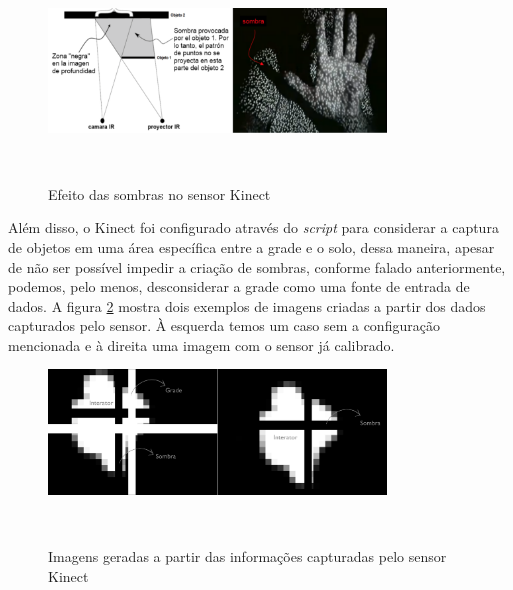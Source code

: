 \begin{figure}[H]
  \begin{center}
    \caption{Efeito das sombras no sensor Kinect}
    \vspace*{0,2cm}
    \includegraphics[width=0.8\textwidth]{./04-figuras/kinect_sombras}
    \label{fig:kinect_sombras}
  \end{center}
  \vspace*{-0,5cm}
  \\
\end{figure}

Além disso, o Kinect foi configurado através do \textit{script} para considerar a captura de objetos em uma área específica entre a grade e o solo, dessa maneira, apesar de não ser possível impedir a criação de sombras, conforme falado anteriormente, podemos, pelo menos, desconsiderar a grade como uma fonte de entrada de dados. A figura \ref{fig:kinect_exemplo} mostra dois exemplos de imagens criadas a partir dos dados capturados pelo sensor. À esquerda temos um caso sem a configuração mencionada e à direita uma imagem com o sensor já calibrado.

\begin{figure}[H]
  \begin{center}
    \caption{Imagens geradas a partir das informações capturadas pelo sensor Kinect}
    \vspace*{0,2cm}
    \includegraphics[width=0.8\textwidth]{./04-figuras/kinect_exemplo}
    \label{fig:kinect_exemplo}
  \end{center}
  \vspace*{-0,5cm}
  \\
\end{figure}


